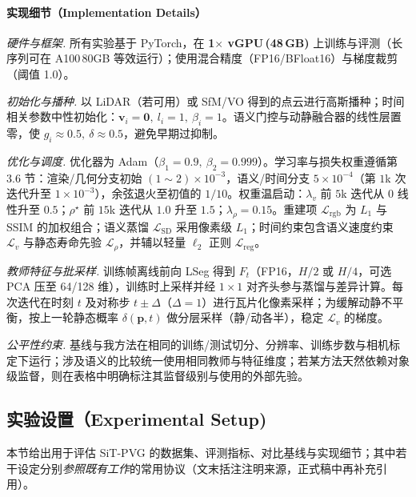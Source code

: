 \documentclass[10pt,conference]{IEEEtran} %
\begin{document}
\paragraph{实现细节（Implementation Details）}
\emph{硬件与框架.} 所有实验基于 PyTorch，在 \textbf{1\(\times\) vGPU\,(48\,GB)} 上训练与评测（长序列可在 A100\,80GB 等效运行）；使用混合精度（FP16/BFloat16）与梯度裁剪（阈值 1.0）。

\emph{初始化与播种.} 以 LiDAR（若可用）或 SfM/VO 得到的点云进行高斯播种；时间相关参数中性初始化：\(\bm v_i{=}\bm 0,\ l_i{=}1,\ \beta_i{=}1\)。语义门控与动静融合器的线性层置零，使 \(g_i\!\approx\!0.5,\ \delta\!\approx\!0.5\)，避免早期过抑制。

\emph{优化与调度.} 优化器为 Adam（\(\beta_1{=}0.9,\ \beta_2{=}0.999\)）。学习率与损失权重遵循第 3.6 节：渲染/几何分支初始 \((1\!\sim\!2)\times 10^{-3}\)，语义/时间分支 \(5\times10^{-4}\)（第 \(1\)k 次迭代升至 \(1\times10^{-3}\)），余弦退火至初值的 \(1/10\)。权重温启动：\(\lambda_v\) 前 \(5\)k 迭代从 \(0\) 线性升至 \(0.5\)；\(\rho^\star\) 前 \(15\)k 迭代从 \(1.0\) 升至 \(1.5\)；\(\lambda_\rho{=}0.15\)。重建项 \(\mathcal L_{\mathrm{rgb}}\) 为 \(L_1\) 与 SSIM 的加权组合；语义蒸馏 \(\mathcal L_{\mathrm{SD}}\) 采用像素级 \(L_1\)；时间约束包含语义速度约束 \(\mathcal L_v\) 与静态寿命先验 \(\mathcal L_\rho\)，并辅以轻量 \(\ell_2\) 正则 \(\mathcal L_{\mathrm{reg}}\)。

\emph{教师特征与批采样.} 训练帧离线前向 LSeg 得到 \(F_t\)（FP16，\(H/2\) 或 \(H/4\)，可选 PCA 压至 64/128 维），训练时上采样并经 \(1{\times}1\) 对齐头参与蒸馏与差异计算。每次迭代在时刻 \(t\) 及对称步 \(t\pm\Delta\)（\(\Delta{=}1\)）进行瓦片化像素采样；为缓解动静不平衡，按上一轮静态概率 \(\delta(\mathbf p,t)\) 做分层采样（静/动各半），稳定 \(\mathcal L_v\) 的梯度。

\emph{公平性约束.} 基线与我方法在相同的训练/测试切分、分辨率、训练步数与相机标定下运行；涉及语义的比较统一使用相同教师与特征维度；若某方法天然依赖对象级监督，则在表格中明确标注其监督级别与使用的外部先验。


\subsection{实验设置（Experimental Setup)}
本节给出用于评估 SiT\mbox{-}PVG 的数据集、评测指标、对比基线与实现细节；其中若干设定分别\emph{参照既有工作}的常用协议（文末括注注明来源，正式稿中再补充引用）。
\end{document}
